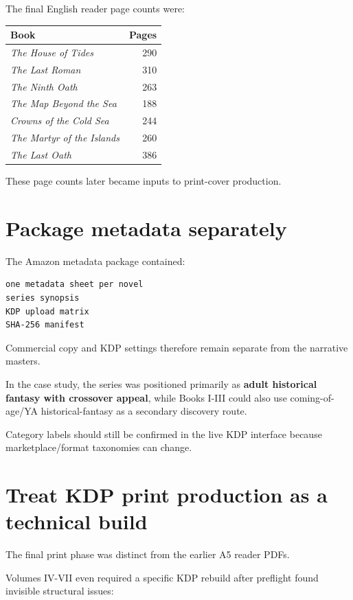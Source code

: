 \documentclass[11pt,oneside,openany]{book}
\begin{document}
The final English reader page counts were:

\begin{longtable}[]{@{}lr@{}}
\toprule\noalign{}
Book & Pages \\
\midrule\noalign{}
\endhead
\bottomrule\noalign{}
\endlastfoot
\emph{The House of Tides} & 290 \\
\emph{The Last Roman} & 310 \\
\emph{The Ninth Oath} & 263 \\
\emph{The Map Beyond the Sea} & 188 \\
\emph{Crowns of the Cold Sea} & 244 \\
\emph{The Martyr of the Islands} & 260 \\
\emph{The Last Oath} & 386 \\
\end{longtable}

These page counts later became inputs to print-cover production.

\chapter{Package metadata separately}

The Amazon metadata package contained:

\begin{lstlisting}
one metadata sheet per novel
series synopsis
KDP upload matrix
SHA-256 manifest
\end{lstlisting}

Commercial copy and KDP settings therefore remain separate from the narrative masters.

In the case study, the series was positioned primarily as \textbf{adult historical fantasy with crossover appeal}, while Books I-III could also use coming-of-age/YA historical-fantasy as a secondary discovery route.

Category labels should still be confirmed in the live KDP interface because marketplace/format taxonomies can change.

\chapter{Treat KDP print production as a technical build}

The final print phase was distinct from the earlier A5 reader PDFs.

Volumes IV-VII even required a specific KDP rebuild after preflight found invisible structural issues:
\end{document}
